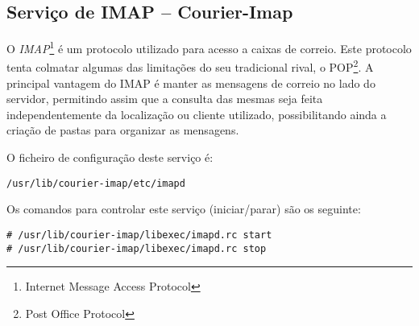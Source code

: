 \subsection{Serviço de IMAP -- Courier-Imap}

O \emph{IMAP}\footnote{Internet Message Access Protocol} é um protocolo utilizado para acesso a caixas de correio.
Este protocolo tenta colmatar algumas das limitações do seu tradicional rival, o POP\footnote{Post Office Protocol}.
A principal vantagem do IMAP é manter as mensagens de correio no lado do servidor, permitindo assim que a consulta das mesmas seja feita independentemente da localização ou cliente utilizado, possibilitando ainda a criação de pastas para organizar as mensagens.

O ficheiro de configuração deste serviço é:

\begin{Verbatim}[commandchars=\\\{\}]
/usr/lib/courier-imap/etc/imapd
\end{Verbatim}

Os comandos para controlar este serviço (iniciar/parar) são os seguinte:

\begin{Verbatim}[commandchars=\\\{\}]
# /usr/lib/courier-imap/libexec/imapd.rc start
# /usr/lib/courier-imap/libexec/imapd.rc stop
\end{Verbatim}

